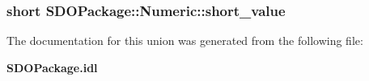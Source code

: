 \subsubsection{\setlength{\rightskip}{0pt plus 5cm}short {\bf SDOPackage::Numeric::short\_\-value}}\label{unionSDOPackage_1_1Numeric_SDOPackage_1_1Numerico0}




The documentation for this union was generated from the following file:\begin{CompactItemize}
\item 
{\bf SDOPackage.idl}\end{CompactItemize}
